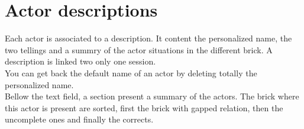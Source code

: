 \section{Actor descriptions}
\label{fiche_acteur}
Each actor is associated to a description. It content the personalized name, the two tellings and a summry of the actor situations in the different brick. A description is linked two only one session.\\

You can get back the default name of an actor by deleting totally the personalized name.\\


Bellow the text field, a section present a summary of the actors. The brick where this actor is present are sorted, first the brick with gapped relation, then the uncomplete ones and finally the corrects.\\

